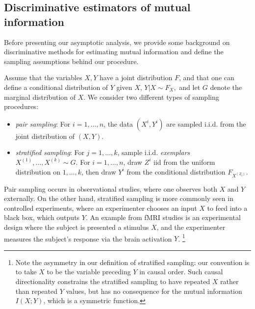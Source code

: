 \documentclass{article}
\begin{document}
\subsection{Discriminative estimators of mutual information}

Before presenting our asymptotic analysis, we provide some background
on discriminative methods for estimating mutual information and
define the sampling assumptions behind our procedure.

Assume that the variables $X, Y$ have a joint distribution $F$, and
that one can define a conditional distribution of $Y$ given $X$,
$Y|X \sim F_X,$
and let $G$ denote the marginal distribution of $X$.
We consider two different types of sampling procedures:
\begin{itemize}
\item \emph{pair sampling}:  For $i = 1,\hdots, n$, the data $(X^i, Y^i)$ are sampled i.i.d. from the joint distribution of $(X, Y)$.
\item \emph{stratified sampling}:  For $j = 1,\hdots, k$, sample i.i.d. \emph{exemplars} $X^{(1)},\hdots, X^{(k)} \sim G$.  For $i = 1,\hdots, n$, draw $Z^i$ iid from the uniform distribution on $1,\hdots, k$, then draw $Y^i$ from the conditional distribution $F_{X^{(Z_i)}}$.
\end{itemize}

Pair sampling occurs in observational studies, where one observes both $X$ and $Y$ externally.  On the other hand, stratified sampling is more commonly seen in controlled experiments, where an experimenter chooses an input $X$ to feed into a black box, which outputs $Y$.  An example from fMRI studies is an experimental design where the subject is presented a stimulus $X$, and the experimenter measures the subject's response via the brain activation $Y$. \footnote{Note the asymmetry in our definition of stratified sampling: our convention is to take $X$ to be the variable preceding $Y$ in causal order.  Such causal directionality constrains the stratified sampling to have repeated $X$ rather than repeated $Y$ values, but has no consequence for the mutual information $I(X; Y)$, which is a symmetric function.}
\end{document}
